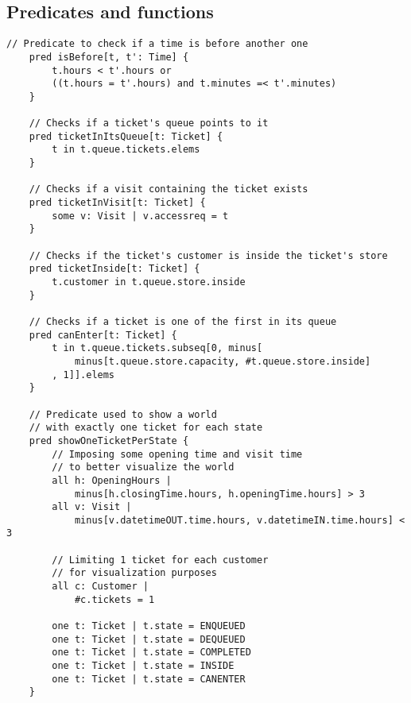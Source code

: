 
\subsection{Predicates and functions}

\begin{lstlisting}[language=alloy]
	// Predicate to check if a time is before another one
	pred isBefore[t, t': Time] {
		t.hours < t'.hours or
		((t.hours = t'.hours) and t.minutes =< t'.minutes)
	}
	
	// Checks if a ticket's queue points to it 
	pred ticketInItsQueue[t: Ticket] {
		t in t.queue.tickets.elems
	}
	
	// Checks if a visit containing the ticket exists 
	pred ticketInVisit[t: Ticket] {
		some v: Visit | v.accessreq = t
	}
	
	// Checks if the ticket's customer is inside the ticket's store
	pred ticketInside[t: Ticket] {
		t.customer in t.queue.store.inside
	}
	
	// Checks if a ticket is one of the first in its queue
	pred canEnter[t: Ticket] {
		t in t.queue.tickets.subseq[0, minus[
			minus[t.queue.store.capacity, #t.queue.store.inside]
		, 1]].elems 
	}

	// Predicate used to show a world
	// with exactly one ticket for each state
	pred showOneTicketPerState {
		// Imposing some opening time and visit time
		// to better visualize the world
		all h: OpeningHours | 
			minus[h.closingTime.hours, h.openingTime.hours] > 3 
		all v: Visit | 
			minus[v.datetimeOUT.time.hours, v.datetimeIN.time.hours] < 3 
		
		// Limiting 1 ticket for each customer 
		// for visualization purposes
		all c: Customer |
			#c.tickets = 1
		
		one t: Ticket | t.state = ENQUEUED
		one t: Ticket | t.state = DEQUEUED
		one t: Ticket | t.state = COMPLETED
		one t: Ticket | t.state = INSIDE
		one t: Ticket | t.state = CANENTER
	}
\end{lstlisting}